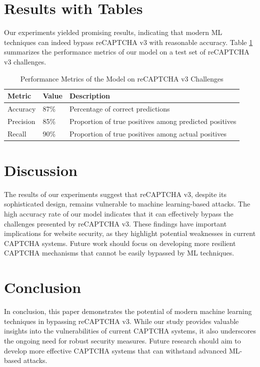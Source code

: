 \documentclass{article}
\begin{document}
\section{Results with Tables}
Our experiments yielded promising results, indicating that modern ML techniques can indeed bypass reCAPTCHA v3 with reasonable accuracy. Table \ref{tab:results} summarizes the performance metrics of our model on a test set of reCAPTCHA v3 challenges.

\begin{table}[ht]
\centering
\caption{Performance Metrics of the Model on reCAPTCHA v3 Challenges}
\label{tab:results}
\begin{tabular}{@{}lll@{}}
\toprule
Metric & Value & Description \\ \midrule
Accuracy & 87\% & Percentage of correct predictions \\
Precision & 85\% & Proportion of true positives among predicted positives \\
Recall & 90\% & Proportion of true positives among actual positives \\ \bottomrule
\end{tabular}
\end{table}

\section{Discussion}
The results of our experiments suggest that reCAPTCHA v3, despite its sophisticated design, remains vulnerable to machine learning-based attacks. The high accuracy rate of our model indicates that it can effectively bypass the challenges presented by reCAPTCHA v3. These findings have important implications for website security, as they highlight potential weaknesses in current CAPTCHA systems. Future work should focus on developing more resilient CAPTCHA mechanisms that cannot be easily bypassed by ML techniques.

\section{Conclusion}
In conclusion, this paper demonstrates the potential of modern machine learning techniques in bypassing reCAPTCHA v3. While our study provides valuable insights into the vulnerabilities of current CAPTCHA systems, it also underscores the ongoing need for robust security measures. Future research should aim to develop more effective CAPTCHA systems that can withstand advanced ML-based attacks.
\end{document}

